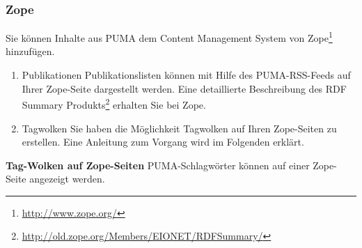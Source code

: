\subsubsection{Zope}
Sie können Inhalte aus PUMA dem Content Management System von Zope\footnote{\url{http://www.zope.org/}} hinzufügen.
\begin{enumerate}
    \item Publikationen\newline
    Publikationslisten können mit Hilfe des PUMA-RSS-Feeds auf Ihrer Zope-Seite dargestellt werden. Eine detaillierte Beschreibung des RDF Summary Produkts\footnote{\url{http://old.zope.org/Members/EIONET/RDFSummary/}} erhalten Sie bei Zope.
    \item Tagwolken\newline
    Sie haben die Möglichkeit Tagwolken auf Ihren Zope-Seiten zu  erstellen. Eine Anleitung zum Vorgang wird im Folgenden erklärt.
\end{enumerate}
\textbf{Tag-Wolken auf Zope-Seiten} \newline\newline
PUMA-Schlagwörter können auf einer Zope-Seite angezeigt werden. 
